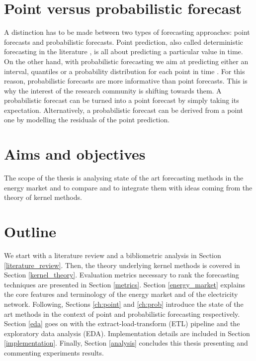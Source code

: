 \section{Point versus probabilistic forecast}
A distinction has to be made between two types of forecasting approaches: point forecasts and probabilistic forecasts.
Point prediction, also called deterministic forecasting in the literature \cite{EPF_review}, is all about predicting a particular value in time.
On the other hand, with probabilistic forecasting we aim at predicting either an interval, quantiles or a probability distribution for each point in time \cite{nowotarski}. For this reason, probabilistic forecasts are more informative than point forecasts. This is why the interest of the research community is shifting towards them.
A probabilistic forecast can be turned into a point forecast by simply taking its expectation.
Alternatively, a probabilistic forecast can be derived from a point one by modelling the residuals of the point prediction.



\section{Aims and objectives}


The scope of the thesis is analysing state of the art forecasting methods in the energy market and to compare and to integrate them with ideas coming from the theory of kernel methods.  



\section{Outline}
We start with a literature review and a bibliometric analysis in Section \ref{literature_review}.
Then, the theory underlying kernel methods is covered in Section \ref{kernel_theory}. Evaluation metrics necessary to rank the forecasting techniques are presented in Section \ref{metrics}. Section \ref{energy_market} explains the core features and terminology of the energy market and of the electricity network.
Following, Sections \ref{ch:point} and \ref{ch:prob} introduce the state of the art methods in the context of point and probabilistic forecasting respectively.
Section \ref{eda} goes on with the extract-load-transform (ETL) pipeline and the exploratory data analysis (EDA). 
Implementation details are included in Section \ref{implementation}.
Finally, Section \ref{analysis} concludes this thesis presenting and commenting experiments results.
